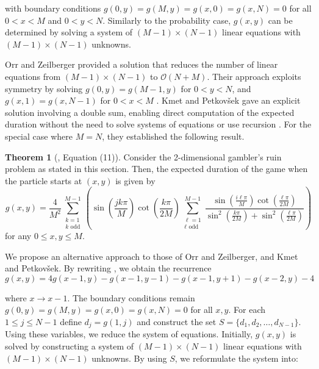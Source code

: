 \documentclass[reqno]{amsart}
\theoremstyle{definition}
\newtheorem{theorem}{Theorem}[section]
\theoremstyle{definition}
\theoremstyle{remark}
\begin{document}
with boundary conditions $g(0,y)=g(M,y)=g(x,0)=g(x,N)=0$ for all $0<x<M$ and $0<y<N$. Similarly to the probability case, $g(x,y)$ can be determined  by solving a system of $(M-1)\times(N-1)$ linear equations with $(M-1)\times(N-1)$ unknowns. 


Orr and Zeilberger provided a solution that reduces the number of linear equations from $(M-1)\times(N-1)$ to $\mathcal{O}(N+M)$. Their approach exploits symmetry by solving $g(0,y)=g(M-1,y)$ for $0<y<N$, and $g(x,1)=g(x,N-1)$ for $0<x<M$ \cite{OrrDoron}. Kmet and Petkov\v{s}ek gave an explicit solution involving a double sum, enabling direct computation of the expected duration without the need to solve systems of equations or use recursion \cite{Kmet}. For the special case where $M=N$, they established the following result.


\begin{theorem}[\cite{Kmet}, Equation (11)]
Consider the 2-dimensional gambler's ruin problem as stated in this section. Then, the expected duration of the game when the particle starts at $(x,y)$ is given by
\begin{equation*}
    g(x,y)=\frac{4}{M^2}\sum_{\substack{k=1 \\ k \text{ odd}}}^{M-1} \left(\sin{\left(\frac{jk\pi}{M}\right)}\cot{\left(\frac{k\pi}{2M}\right)} \sum_{\substack{\ell=1 \\ \ell \text{ odd}}}^{M-1} \frac{\sin{(\frac{i\ell\pi}{M})}\cot{(\frac{\ell\pi}{2M})}}{\sin^2{(\frac{k\pi}{2M})}+\sin^2{(\frac{\ell \pi}{2M})}}\right)
\end{equation*}
for any $0\leq x,y\leq M$.
\end{theorem}

We propose an alternative approach to those of Orr and Zeilberger, and Kmet and Petkov\v{s}ek. By rewriting , we obtain the recurrence
\begin{equation}\label{eq:2d new expected recurrence}
    g(x,y)=4g(x-1,y)-g(x-1,y-1)-g(x-1,y+1)-g(x-2,y)-4
\end{equation}

where $x\to x-1$. The boundary conditions remain $g(0,y)=g(M,y)=g(x,0)=g(x,N)=0$ for all $x,y$. For each $1\leq j \leq N-1$ define $d_j=g(1,j)$ and construct the set $S=\{d_1,d_2,\ldots, d_{N-1}\}$. Using these variables, we reduce the system of equations. Initially, $g(x,y)$ is solved by constructing a system of $(M-1)\times(N-1)$ linear equations with $(M-1)\times(N-1)$ unknowns. By using $S$,  we reformulate the system into:
\end{document}
